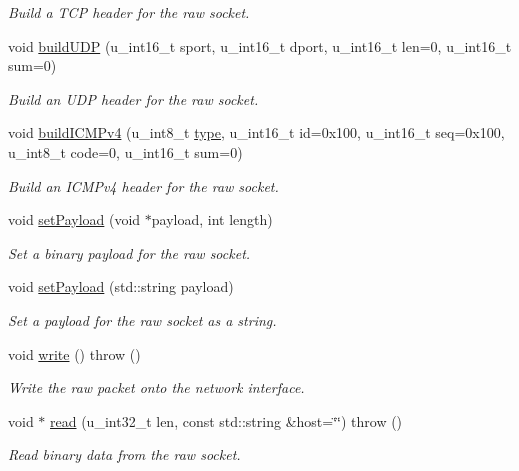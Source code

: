 \begin{CompactItemize}
\begin{CompactList}\small\item\em Build a TCP header for the raw socket. \item\end{CompactList}\item 
void \hyperlink{classRawSocket_90915831a7ac1046e07635da346a54fe}{buildUDP} (u\_\-int16\_\-t sport, u\_\-int16\_\-t dport, u\_\-int16\_\-t len=0, u\_\-int16\_\-t sum=0)
\begin{CompactList}\small\item\em Build an UDP header for the raw socket. \item\end{CompactList}\item 
void \hyperlink{classRawSocket_07d676b2f5becf9fad465b7f63f9d3a3}{buildICMPv4} (u\_\-int8\_\-t \hyperlink{classSocket_c7f6980f36023df2004271c336217cb8}{type}, u\_\-int16\_\-t id=0x100, u\_\-int16\_\-t seq=0x100, u\_\-int8\_\-t code=0, u\_\-int16\_\-t sum=0)
\begin{CompactList}\small\item\em Build an ICMPv4 header for the raw socket. \item\end{CompactList}\item 
void \hyperlink{classRawSocket_4969ba6947943aed82dc3cebb5c0f708}{setPayload} (void $\ast$payload, int length)
\begin{CompactList}\small\item\em Set a binary payload for the raw socket. \item\end{CompactList}\item 
void \hyperlink{classRawSocket_2e97eed0b10d4f48012eedde25099fd1}{setPayload} (std::string payload)
\begin{CompactList}\small\item\em Set a payload for the raw socket as a string. \item\end{CompactList}\item 
void \hyperlink{classRawSocket_149999a5d231c93e206be89eec9732b8}{write} ()  throw ()
\begin{CompactList}\small\item\em Write the raw packet onto the network interface. \item\end{CompactList}\item 
void $\ast$ \hyperlink{classRawSocket_f41dd9eca89c3e4bb5c5bbf5af10dbd7}{read} (u\_\-int32\_\-t len, const std::string \&host=\char`\"{}\char`\"{})  throw ()
\begin{CompactList}\small\item\em Read binary data from the raw socket. \item\end{CompactList}\end{CompactItemize}


